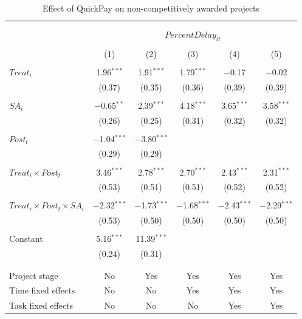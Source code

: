 \documentclass[
]{article}
\begin{document}
\begin{table}[H] \centering 
  \caption{Effect of QuickPay on non-competitively awarded projects} 
  \label{} 
\small 
\begin{tabular}{@{\extracolsep{-2pt}}lccccc} 
\\[-1.8ex]\hline 
\hline \\[-1.8ex] 
\\[-1.8ex] & \multicolumn{5}{c}{$PercentDelay_{it}$  } \\ 
\\[-1.8ex] & (1) & (2) & (3) & (4) & (5)\\ 
\hline \\[-1.8ex] 
 $Treat_i$ & 1.96$^{***}$ & 1.91$^{***}$ & 1.79$^{***}$ & $-$0.17 & $-$0.02 \\ 
  & (0.37) & (0.35) & (0.36) & (0.39) & (0.39) \\ 
  & & & & & \\ 
 $SA_i$ & $-$0.65$^{**}$ & 2.39$^{***}$ & 4.18$^{***}$ & 3.65$^{***}$ & 3.58$^{***}$ \\ 
  & (0.26) & (0.25) & (0.31) & (0.32) & (0.32) \\ 
  & & & & & \\ 
 $Post_t$ & $-$1.04$^{***}$ & $-$3.80$^{***}$ &  &  &  \\ 
  & (0.29) & (0.29) &  &  &  \\ 
  & & & & & \\ 
 $Treat_i \times Post_t$ & 3.46$^{***}$ & 2.78$^{***}$ & 2.70$^{***}$ & 2.43$^{***}$ & 2.31$^{***}$ \\ 
  & (0.53) & (0.51) & (0.51) & (0.52) & (0.52) \\ 
  & & & & & \\ 
 $Treat_i \times Post_t \times SA_i $ & $-$2.32$^{***}$ & $-$1.73$^{***}$ & $-$1.68$^{***}$ & $-$2.43$^{***}$ & $-$2.29$^{***}$ \\ 
  & (0.53) & (0.50) & (0.50) & (0.50) & (0.50) \\ 
  & & & & & \\ 
 Constant & 5.16$^{***}$ & 11.39$^{***}$ &  &  &  \\ 
  & (0.24) & (0.31) &  &  &  \\ 
  & & & & & \\ 
\hline \\[-1.8ex] 
Project stage & No & Yes & Yes & Yes & Yes \\ 
Time fixed effects & No & No & Yes & Yes & Yes \\ 
Task fixed effects & No & No & No & Yes & Yes \\ 

\end{tabular}
\end{table}
\end{document}
